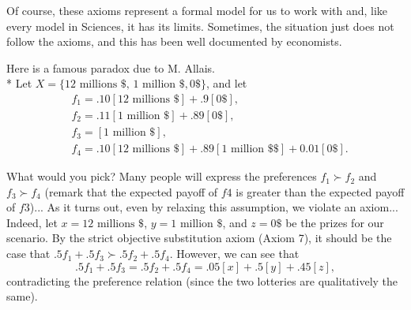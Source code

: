 Of course, these axioms represent a formal model for us to work with and, like every model in Sciences, it has its limits.  Sometimes, the situation just does not follow the axioms, and this has been well documented by economists.

\begin{example}
\label{ch1:paradoxAllais}
Here is a famous paradox due to M. Allais.\\*
Let $X = \{12 \text{ millions \$}, \, 1 \text{ million \$}, 0 \$ \}$,
and let
\begin{equation}
\begin{aligned}
&f_1 = .10[12 \text{ millions \$}] + .9[0 \$ ], \\
&f_2 = .11[1 \text{ million \$}] + .89[0 \$ ], \\
&f_3 = [1 \text{ million \$}], \\
&f_4 = .10[12 \text{ millions \$}] + .89[1 \text{ million \$} \$ ] + 0.01[0 \$].
\end{aligned}
\end{equation}

What would you pick? Many people will express the preferences $f_1 \succ f_2$ and $f_3\succ f_4$ (remark that the expected payoff of $f4$ is greater than the expected payoff of $f3$)...
As it turns out, even by relaxing this assumption, we violate an axiom...
Indeed, let $x = 12 \text{ millions \$}$, $y = 1 \text{ million \$} $, and $z = 0 \$ $ be the prizes for our scenario.
By the strict objective substitution axiom (Axiom 7), it should be the case that $.5f_1 + .5f_3 \succ .5 f_2 + .5f_4.$
However, we can see that
$$ .5 f_1 + .5 f_3 = .5 f_2 + .5f_4 = .05[x]+.5[y]+.45[z],$$
contradicting the preference relation (since the two lotteries are qualitatively the same).


\end{example}



\ifx \globalmark \undefined %


	
\else

\fi

